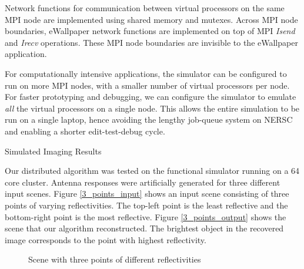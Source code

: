 \documentclass[twocolumn]{article}
\makeatletter
\def\section{\@startsection{section}{1}{\z@}{24pt plus 2 pt
minus 2 pt} {12pt plus 2pt minus 2pt}{\large\bf}}
\makeatother
\begin{document}
Network functions for communication between virtual processors on the same MPI node are implemented using shared memory and mutexes. Across MPI node boundaries, eWallpaper network functions are implemented on top of MPI \emph{Isend} and \emph{Irecv} operations. These MPI node boundaries are invisible to the eWallpaper application.

For computationally intensive applications, the simulator can be configured to run on more MPI nodes, with a smaller number of virtual processors per node. For faster prototyping and debugging, we can configure the simulator to emulate {\em all} the virtual processors on a single node. This allows the entire simulation to be run on a single laptop, hence avoiding the lengthy job-queue system on NERSC and enabling a shorter edit-test-debug cycle.

\section{Simulated Imaging Results}

Our distributed algorithm was tested on the functional simulator running on a 64 core cluster. Antenna responses were artificially generated for three different input scenes. Figure \ref{3_points_input} shows an input scene consisting of three points of varying reflectivities. The top-left point is the least reflective and the bottom-right point is the most reflective. Figure \ref{3_points_output} shows the scene that our algorithm reconstructed. The brightest object in the recovered image corresponds to the point with highest reflectivity. 

\begin{figure}
\begin{centering}

	
\end{centering}
\caption{Scene with three points of different reflectivities}
\end{figure}
\end{document}
